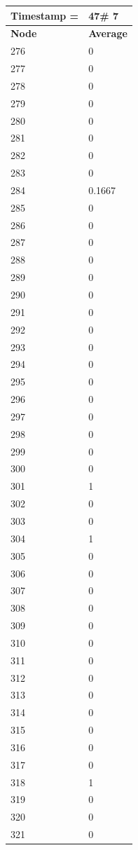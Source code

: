 \begin{tabular}{|l||l|}
\hline
\textbf{Timestamp =} & \textbf{47}\# 7\\\hline
	\textbf{Node} & \textbf{Average} \\ \hline
\hline
	276 & 0 \\ \hline
	277 & 0 \\ \hline
	278 & 0 \\ \hline
	279 & 0 \\ \hline
	280 & 0 \\ \hline
	281 & 0 \\ \hline
	282 & 0 \\ \hline
	283 & 0 \\ \hline
	284 & 0.1667 \\ \hline
	285 & 0 \\ \hline
	286 & 0 \\ \hline
	287 & 0 \\ \hline
	288 & 0 \\ \hline
	289 & 0 \\ \hline
	290 & 0 \\ \hline
	291 & 0 \\ \hline
	292 & 0 \\ \hline
	293 & 0 \\ \hline
	294 & 0 \\ \hline
	295 & 0 \\ \hline
	296 & 0 \\ \hline
	297 & 0 \\ \hline
	298 & 0 \\ \hline
	299 & 0 \\ \hline
	300 & 0 \\ \hline
	301 & 1 \\ \hline
	302 & 0 \\ \hline
	303 & 0 \\ \hline
	304 & 1 \\ \hline
	305 & 0 \\ \hline
	306 & 0 \\ \hline
	307 & 0 \\ \hline
	308 & 0 \\ \hline
	309 & 0 \\ \hline
	310 & 0 \\ \hline
	311 & 0 \\ \hline
	312 & 0 \\ \hline
	313 & 0 \\ \hline
	314 & 0 \\ \hline
	315 & 0 \\ \hline
	316 & 0 \\ \hline
	317 & 0 \\ \hline
	318 & 1 \\ \hline
	319 & 0 \\ \hline
	320 & 0 \\ \hline
	321 & 0 \\ \hline
\end{tabular}
